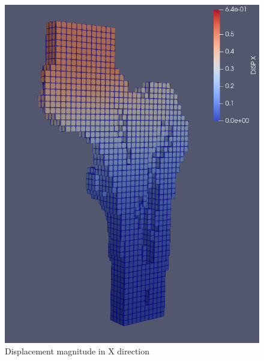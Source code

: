 \documentclass[a4paper,12pt]{article}
\begin{document}
    \begin{figure}[htbp]
        \centering
        \begin{minipage}[b]{0.3\textwidth}
            \includegraphics[width=\textwidth]{displacement-X}
            \caption{Displacement magnitude in X direction}
            \label{fig:displacement-X}
        \end{minipage}
        \hfill
        \begin{minipage}[b]{0.3\textwidth}

\end{minipage}
\end{figure}
\end{document}
